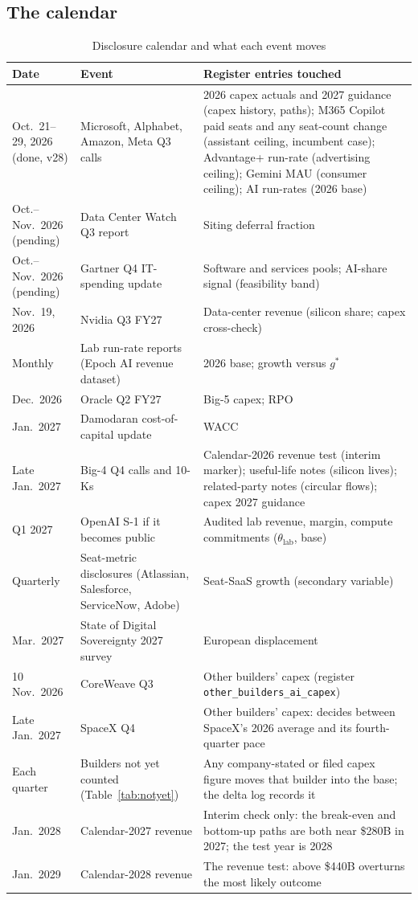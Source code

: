 \documentclass[11pt,letterpaper]{article}
\begin{document}
\subsection*{The calendar}
\begin{table}[htbp]
\centering\small
\caption{Disclosure calendar and what each event moves}
\label{tab:calendar}
\begin{tabularx}{\textwidth}{L{3.2cm}L{4.2cm}X}
\toprule
\textbf{Date} & \textbf{Event} & \textbf{Register entries touched} \\
\midrule
Oct.~21--29, 2026 (done, v28) & Microsoft, Alphabet, Amazon, Meta Q3 calls & 2026 capex actuals and 2027 guidance (capex history, paths); M365 Copilot paid seats and any seat-count change (assistant ceiling, incumbent case); Advantage+ run-rate (advertising ceiling); Gemini MAU (consumer ceiling); AI run-rates (2026 base) \\
Oct.--Nov.~2026 (pending) & Data Center Watch Q3 report & Siting deferral fraction \\
Oct.--Nov.~2026 (pending) & Gartner Q4 IT-spending update & Software and services pools; AI-share signal (feasibility band) \\
Nov.~19, 2026 & Nvidia Q3 FY27 & Data-center revenue (silicon share; capex cross-check) \\
Monthly & Lab run-rate reports (Epoch AI revenue dataset) & 2026 base; growth versus $g^{*}$ \\
Dec.~2026 & Oracle Q2 FY27 & Big-5 capex; RPO \\
Jan.~2027 & Damodaran cost-of-capital update & WACC \\
Late Jan.~2027 & Big-4 Q4 calls and 10-Ks & Calendar-2026 revenue test (interim marker); useful-life notes (silicon lives); related-party notes (circular flows); capex 2027 guidance \\
Q1 2027 & OpenAI S-1 if it becomes public & Audited lab revenue, margin, compute commitments ($\theta_{\text{lab}}$, base) \\
Quarterly & Seat-metric disclosures (Atlassian, Salesforce, ServiceNow, Adobe) & Seat-SaaS growth (secondary variable) \\
Mar.~2027 & State of Digital Sovereignty 2027 survey & European displacement \\
10 Nov.~2026 & CoreWeave Q3 & Other builders' capex (register \texttt{other\_builders\_ai\_capex}) \\
Late Jan.~2027 & SpaceX Q4 & Other builders' capex: decides between SpaceX's 2026 average and its fourth-quarter pace \\
Each quarter & Builders not yet counted (Table~\ref{tab:notyet}) & Any company-stated or filed capex figure moves that builder into the base; the delta log records it \\
Jan.~2028 & Calendar-2027 revenue & Interim check only: the break-even and bottom-up paths are both near \$280B in 2027; the test year is 2028 \\
Jan.~2029 & Calendar-2028 revenue & The revenue test: above \$440B overturns the most likely outcome \\
\bottomrule
\end{tabularx}
\end{table}
\end{document}
